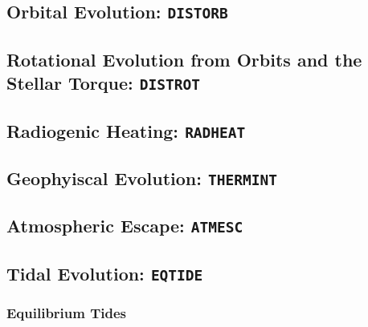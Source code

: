 \documentclass[preprint,12pt]{aastex}
\def\atmesc{\texttt{ATMESC}}
\def\distorb{\texttt{DISTORB}}
\def\distrot{\texttt{DISTROT}}
\def\eqtide{\texttt{EQTIDE}}
\def\radheat{\texttt{RADHEAT}}
\def\thermint{\texttt{THERMINT}}
\begin{document}

\subsection{Orbital Evolution: \distorb}


\subsection{Rotational Evolution from Orbits and the Stellar Torque: \distrot}


\subsection{Radiogenic Heating: \radheat}


\subsection{Geophyiscal Evolution: \thermint}


\subsection{Atmospheric Escape: \atmesc}


\subsection{Tidal Evolution: \eqtide}

\subsubsection{Equilibrium Tides}
\end{document}
